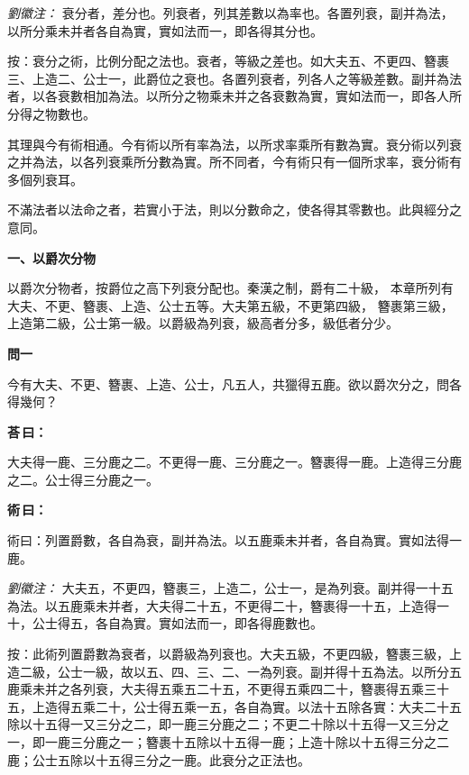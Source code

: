 \documentclass[11pt,a4paper]{article}
\newenvironment{problem}[1][]{%
  \par\vspace{0.6em}\noindent\textcolor{problemcolor}{\textbf{問\ignorespaces#1\unskip}\hspace{0.5em}}%
  \ignorespaces
}{\par\vspace{0.4em}}
\newenvironment{answer}{%
  \par\noindent\textcolor{answercolor}{\textbf{荅\,曰：}}%
  \ignorespaces
}{\par\vspace{0.3em}}
\newenvironment{method}{%
  \par\noindent\textcolor{methodcolor}{\textbf{術\,曰：}}%
  \ignorespaces
}{\par\vspace{0.4em}}
\newenvironment{liuhuicomm}{%
  \par\vspace{0.3em}\noindent\textcolor{commentarycolor}{\small\textit{劉徽注：}}}%
  {\par\vspace{0.5em}}
\begin{document}
\begin{liuhuicomm}
衰分者，差分也。列衰者，列其差數以為率也。各置列衰，副并為法，以所分乘未并者各自為實，實如法而一，即各得其分也。

按：衰分之術，比例分配之法也。衰者，等級之差也。如大夫五、不更四、簪裹三、上造二、公士一，此爵位之衰也。各置列衰者，列各人之等級差數。副并為法者，以各衰數相加為法。以所分之物乘未并之各衰數為實，實如法而一，即各人所分得之物數也。

其理與今有術相通。今有術以所有率為法，以所求率乘所有數為實。衰分術以列衰之并為法，以各列衰乘所分數為實。所不同者，今有術只有一個所求率，衰分術有多個列衰耳。

不滿法者以法命之者，若實小于法，則以分數命之，使各得其零數也。此與經分之意同。
\end{liuhuicomm}

\vspace{0.8em}
\noindent\textbf{\large 一、以爵次分物}
\vspace{0.5em}

\noindent 以爵次分物者，按爵位之高下列衰分配也。秦漢之制，爵有二十級，
本章所列有大夫、不更、簪裹、上造、公士五等。大夫第五級，不更第四級，
簪裹第三級，上造第二級，公士第一級。以爵級為列衰，級高者分多，級低者分少。

\begin{problem}[一]
今有大夫、不更、簪裹、上造、公士，凡五人，共獵得五鹿。欲以爵次分之，問各得幾何？
\end{problem}

\begin{answer}
大夫得一鹿、三分鹿之二。不更得一鹿、三分鹿之一。簪裹得一鹿。上造得三分鹿之二。公士得三分鹿之一。
\end{answer}

\begin{method}
術曰：列置爵數，各自為衰，副并為法。以五鹿乘未并者，各自為實。實如法得一鹿。
\end{method}

\begin{liuhuicomm}
大夫五，不更四，簪裹三，上造二，公士一，是為列衰。副并得一十五為法。以五鹿乘未并者，大夫得二十五，不更得二十，簪裹得一十五，上造得一十，公士得五，各自為實。實如法而一，即各得鹿數也。

按：此術列置爵數為衰者，以爵級為列衰也。大夫五級，不更四級，簪裹三級，上造二級，公士一級，故以五、四、三、二、一為列衰。副并得十五為法。以所分五鹿乘未并之各列衰，大夫得五乘五二十五，不更得五乘四二十，簪裹得五乘三十五，上造得五乘二十，公士得五乘一五，各自為實。以法十五除各實：大夫二十五除以十五得一又三分之二，即一鹿三分鹿之二；不更二十除以十五得一又三分之一，即一鹿三分鹿之一；簪裹十五除以十五得一鹿；上造十除以十五得三分之二鹿；公士五除以十五得三分之一鹿。此衰分之正法也。
\end{liuhuicomm}
\end{document}
